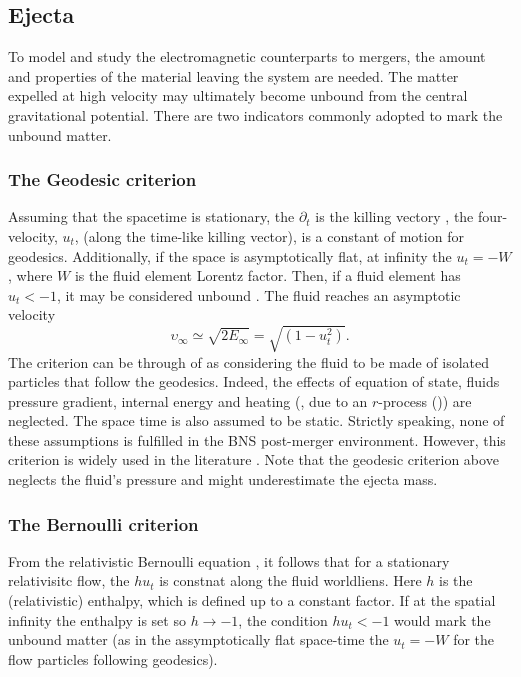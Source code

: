 \subsection{Ejecta}


To model and study the electromagnetic counterparts to mergers, the amount and properties of the material
leaving the system are needed.
The matter expelled at high velocity may ultimately become unbound from the central gravitational
potential. There are two indicators commonly adopted to mark the unbound matter.

\subsubsection{The Geodesic criterion}

Assuming that the spacetime is stationary, the $\partial_t$ is the killing vectory , 
the four-velocity, $u_t$, (along the time-like killing vector), is a constant of motion for geodesics. 
Additionally, if the space is asymptotically flat, at infinity the $u_t = -W$, where $W$ is the fluid element Lorentz factor. Then, if a fluid element has $u_t < -1$, it may be considered unbound . 
The fluid reaches an asymptotic velocity 
\begin{equation}
\upsilon_{\infty} \simeq \sqrt{2E_{\infty}} = \sqrt{(1-u_t ^2)}.
\end{equation}
The criterion can be through of as considering the fluid to be made of isolated particles that follow the geodesics. Indeed, the effects of equation of state, fluids pressure gradient, internal energy and heating (\eg, due to an $r$-process ()) are neglected. The space time is also assumed to be static.
Strictly speaking, none of these assumptions is fulfilled in the BNS post-merger environment. However, this criterion is widely used in the literature \citep[\eg][]{Radice:2018pdn,Vincent:2019kor}.
Note that the geodesic criterion above neglects the fluid's pressure and might underestimate the ejecta mass.

\subsubsection{The Bernoulli criterion}

From the relativistic Bernoulli equation \citep{Rezzolla:2013}, it follows
that for a stationary relativisitc flow, the $hu_t$ is constnat along the 
fluid worldliens. Here $h$ is the (relativistic) enthalpy, which is
defined up to a constant factor. 
If at the spatial infinity the enthalpy is set so $h\rightarrow-1$, 
the condition $hu_t < -1$ would mark the unbound matter 
(as in the assymptotically flat space-time the $u_t = -W$ for the flow particles following geodesics).

